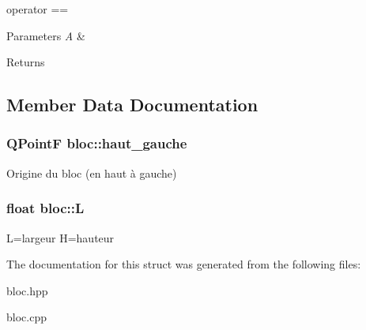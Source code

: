 operator == 


\begin{DoxyParams}{Parameters}
{\em A} & \\
\hline
\end{DoxyParams}
\begin{DoxyReturn}{Returns}

\end{DoxyReturn}


\subsection{Member Data Documentation}
\hypertarget{structbloc_a2fc10cb754a223b8b3d5bc73cddc7696}{
\subsubsection[{haut\-\_\-gauche}]{\setlength{\rightskip}{0pt plus 5cm}Q\-Point\-F bloc\-::haut\-\_\-gauche}}\label{structbloc_a2fc10cb754a223b8b3d5bc73cddc7696}
Origine du bloc (en haut à gauche) \hypertarget{structbloc_a952b25540dde128110d4c1046656cb5e}{
\subsubsection[{L}]{\setlength{\rightskip}{0pt plus 5cm}float bloc\-::\-L}}\label{structbloc_a952b25540dde128110d4c1046656cb5e}
L=largeur H=hauteur 

The documentation for this struct was generated from the following files\-:\begin{DoxyCompactItemize}
\item 
bloc.\-hpp\item 
bloc.\-cpp\end{DoxyCompactItemize}
